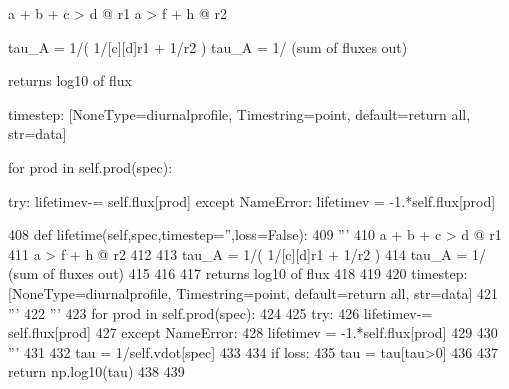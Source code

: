 \begin{DoxyVerb}a + b + c > d     @ r1
a         > f + h @ r2

tau_A = 1/(   1/[c][d]r1   + 1/r2      )
tau_A = 1/ (sum of fluxes out)


returns log10 of flux


timestep: [NoneType=diurnalprofile, Timestring=point, default=return all, str=data]
\end{DoxyVerb}
\begin{DoxyVerb}for prod in self.prod(spec):

    try:
        lifetimev-= self.flux[prod]
    except NameError:
        lifetimev  = -1.*self.flux[prod]\end{DoxyVerb}
 
\begin{DoxyCode}
408     \textcolor{keyword}{def }lifetime(self,spec,timestep='',loss=False):
409             \textcolor{stringliteral}{'''}
410 \textcolor{stringliteral}{            a + b + c > d     @ r1}
411 \textcolor{stringliteral}{            a         > f + h @ r2}
412 \textcolor{stringliteral}{}
413 \textcolor{stringliteral}{            tau\_A = 1/(   1/[c][d]r1   + 1/r2      )}
414 \textcolor{stringliteral}{            tau\_A = 1/ (sum of fluxes out)}
415 \textcolor{stringliteral}{}
416 \textcolor{stringliteral}{}
417 \textcolor{stringliteral}{            returns log10 of flux}
418 \textcolor{stringliteral}{}
419 \textcolor{stringliteral}{}
420 \textcolor{stringliteral}{            timestep: [NoneType=diurnalprofile, Timestring=point, default=return all, str=data]}
421 \textcolor{stringliteral}{            '''}
422             \textcolor{stringliteral}{'''}
423 \textcolor{stringliteral}{            for prod in self.prod(spec):}
424 \textcolor{stringliteral}{}
425 \textcolor{stringliteral}{                            try:}
426 \textcolor{stringliteral}{                                lifetimev-= self.flux[prod]}
427 \textcolor{stringliteral}{                            except NameError:}
428 \textcolor{stringliteral}{                                lifetimev  = -1.*self.flux[prod]}
429 \textcolor{stringliteral}{}
430 \textcolor{stringliteral}{                                '''}
431 
432             tau = 1/self.vdot[spec]
433 
434             \textcolor{keywordflow}{if} loss:
435                 tau = tau[tau>0]
436 
437             \textcolor{keywordflow}{return} np.log10(tau)
438 
439 
\end{DoxyCode}
\mbox{\label{classzhdf_1_1new_af05896dbaac383f107e46d76287d0ea0}} 
